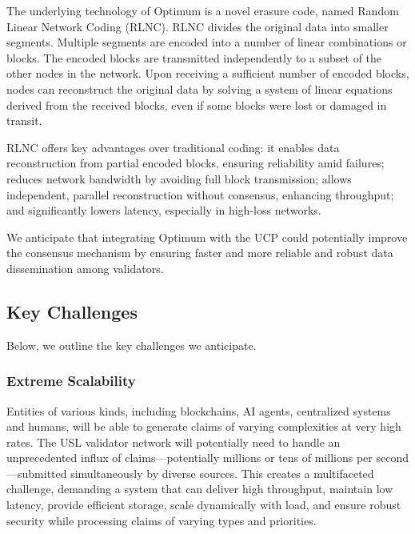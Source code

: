 \documentclass{article}
\newcommand{\UC}{UCP}
\begin{document}
The underlying technology of Optimum is a novel erasure code, named Random Linear Network Coding (RLNC). RLNC divides the original data into smaller segments. Multiple segments are encoded into a number of linear combinations or blocks. The encoded blocks are transmitted independently to a subset of the other nodes in the network. Upon receiving a sufficient number of encoded blocks, nodes can reconstruct the original data by solving a system of linear equations derived from the received blocks, even if some blocks were lost or damaged in transit.

RLNC offers key advantages over traditional coding: it enables data reconstruction from partial encoded blocks, ensuring reliability amid failures; reduces network bandwidth by avoiding full block transmission; allows independent, parallel reconstruction without consensus, enhancing throughput; and significantly lowers latency, especially in high-loss networks.

We anticipate that integrating Optimum with the \UC{} could potentially improve the consensus mechanism by ensuring faster and more reliable and robust data dissemination among validators.

\subsection{Key Challenges}

Below, we outline the key challenges we anticipate.

\subsubsection{Extreme Scalability}

Entities of various kinds, including blockchains, AI agents, centralized systems and humans, will be able to generate claims of varying complexities at very high rates. The USL validator network will potentially need to handle an unprecedented influx of claims—potentially millions or tens of millions per second—submitted simultaneously by diverse sources. This creates a multifaceted challenge, demanding a system that can deliver high throughput, maintain low latency, provide efficient storage, scale dynamically with load, and ensure robust security while processing claims of varying types and priorities.
\end{document}
